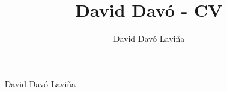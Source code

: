 \documentclass[11pt, a4paper]{awesome-cv}
\title{David Davó - CV}
\author{David Davó Laviña}
\begin{document}
\makecvheader[C]

\makecvfooter
  {\monthname\ \number\year}
  {David Davó Laviña}
  {\thepage}








\end{document}
